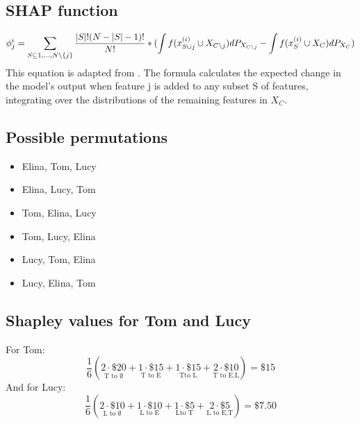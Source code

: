 \documentclass[12pt]{article}
\begin{document}
\subsection{SHAP function}
\label{SHAPfunc}
$$	\phi^{i}_j = \sum_{S \subseteq {1,\ldots,N}\backslash\{j\}} \frac{|S|!(N - |S| - 1)!}{N!} * ( \int f(x_{S \cup j}^{(i)} \cup X_{C\setminus j})dP_{X_{C\setminus j}} \\
- \int f(x_S^{(i)} \cup X_C)dP_{X_C})$$ 
This equation is adapted from \cite[Section~5.5]{molnarSHAP}.
 The formula calculates the expected change in the model's output when feature j is added to any subset S of features, integrating over the distributions of the remaining features in $X_C$. 







\subsection{Possible permutations}
\label{sec:permutations}
\begin{itemize}
	\item Elina, Tom, Lucy
	\item Elina, Lucy, Tom
	\item Tom, Elina, Lucy
	\item Tom, Lucy, Elina
	\item Lucy, Tom, Elina
	\item Lucy, Elina, Tom
\end{itemize}

\subsection{Shapley values for Tom and Lucy}
\label{cal:TimLucy}
For Tom:
\begin{equation}
	\frac{1}{6} \left( 
	\underset{\text{T to } \emptyset}{2 \cdot \$20} + 
	\underset{\text{T to E}}{1 \cdot \$15} + 
	\underset{\text{Tto L}}{1 \cdot \$15} + 
	\underset{\text{T to E,L}}{2 \cdot \$10} 
	\right) = \$15
	\label{eq:tom_shapley}
\end{equation}
And for Lucy:
\begin{equation}
	\frac{1}{6} \left( 
	\underset{\text{L to } \emptyset}{2 \cdot \$10} + 
	\underset{\text{L to E}}{1 \cdot \$10} + 
	\underset{\text{Lto T}}{1 \cdot \$5} + 
	\underset{\text{L to E,T}}{2 \cdot \$5} 
	\right) = \$7.50
	\label{eq:lucy_shapley}
\end{equation}

\newpage




\end{document}
